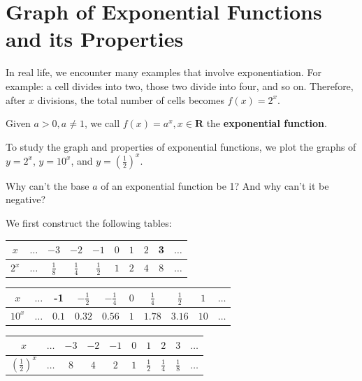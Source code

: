 \documentclass{report}
\begin{document}
\section*{Graph of Exponential Functions and its Properties}

In real life, we encounter many examples that involve exponentiation. For example: a cell divides into two, those two divide into four, and so on. Therefore, after $x$ divisions, the total number of cells becomes $f(x)=2^x$.

Given $a > 0, a \neq 1$, we call $f(x) = a^x, x \in \boldsymbol{R}$ the \textbf{exponential function}.

To study the graph and properties of exponential functions, we plot the graphs of $y = 2^x$, $y = 10^x$, and $y = \left(\frac{1}{2}\right)^x$.

\begin{think}

    Why can't the base $a$ of an exponential function be 1? And why can't it be negative?
\end{think}

We first construct the following tables:
\begin{multicols}{2}
    \begin{center}
        \begin{tabular}{|c|c|c|c|c|c|c|c|c|c|}
            \hline$x$ & $\ldots$ & $-3$ & $-2$ & $-1$ & $0$ & $1$ & $2$ & 3 & $\ldots$ \\
            \hline $2^x$ & $\ldots$ & $\frac{1}{8}$ & $\frac{1}{4}$ & $\frac{1}{2}$ & $1$ & $2$ & $4$ & $8$ & $\ldots$ \\
            \hline
            \end{tabular}
    \end{center}
        \begin{center}
    \vspace*{-1em}
            \begin{tabular}{|c|c|c|c|c|c|c|c|c|c|}
                \hline$x$ & $\ldots$ & -1 & $-\frac{1}{2}$ & $-\frac{1}{4}$ & $0$ & $\frac{1}{4}$ & $\frac{1}{2}$ & $1$ & $\ldots$ \\
                \hline $10^x$ & $\ldots$ & $0.1$ & $0.32$ & $0.56$ & $1$ & $1.78$ & $3.16$ & $10$ & $\ldots$ \\
                \hline
                \end{tabular}
        \end{center}
\end{multicols}
\vspace{-3em}
    \begin{center}
        \begin{tabular}{|c|c|c|c|c|c|c|c|c|c|}
            \hline$x$ & $\ldots$ & $-3$ & $-2$ & $-1$ & $0$ & $1$ & $2$ & $3$ & $\ldots$ \\
            \hline $\left(\frac{1}{2}\right)^x$ & $\ldots$ & $8$ & $4$ & $2$ & $1$ & $\frac{1}{2}$ & $\frac{1}{4}$ & $\frac{1}{8}$ & $\ldots$ \\
            \hline
            \end{tabular}
    \end{center}
\end{document}
